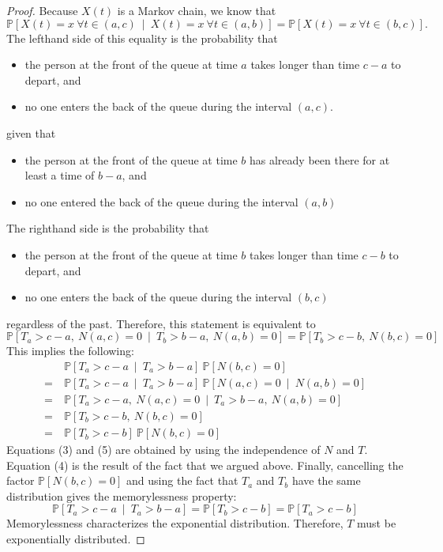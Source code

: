 \documentclass[12pt]{article}
\newcommand{\p}{\mathbb{P}}
\newcommand{\given}{\ \mid \ }
\theoremstyle{definition}
\begin{document}
\begin{proof}
Because $X(t)$ is a Markov chain, we know that
$$\p[X(t) = x \ \forall t \in (a,c) \given X(t) = x \ \forall t \in (a,b)] = \p[X(t) = x \ \forall t \in (b,c)].$$  The lefthand side of this equality is the probability that
\begin{itemize}
\item the person at the front of the queue at time $a$ takes longer than time $c-a$ to depart, and
\item no one enters the back of the queue during the interval $(a,c)$.
\end{itemize}
given that
\begin{itemize}
\item the person at the front of the queue at time $b$ has already been there for at least a time of $b-a$, and
\item no one entered the back of the queue during the interval $(a,b)$
\end{itemize}
The righthand side is the probability that \begin{itemize}
\item the person at the front of the queue at time $b$ takes longer than time $c-b$ to depart, and
\item no one enters the back of the queue during the interval $(b,c)$
\end{itemize}
regardless of the past.  Therefore, this statement is equivalent to
$$
\p[T_a > c-a, \ N(a,c) = 0 \given T_b > b-a, \ N(a,b) = 0] = \p[T_b > c-b, \ N(b,c) = 0]
$$
This implies the following:
\begin{align}
& \ \p[T_a > c-a \given T_a > b-a] \ \p[N(b,c) = 0]
\\
= & \ \p[T_a > c-a \given T_a > b-a] \ \p[N(a,c) = 0 \given  N(a,b) = 0]
\\
= & \ \p[T_a > c-a, \ N(a,c) = 0 \given T_a > b-a, \ N(a,b) = 0]
\\
= & \ \p[T_b > c-b, \ N(b,c) = 0]
\\
= & \ \p[T_b > c-b] \ \p[N(b,c) = 0]
\end{align}
Equations (3) and (5) are obtained by using the independence of $N$ and $T$.  Equation (4) is the result of the fact that we argued above.  Finally, cancelling the factor $\p[N(b,c) = 0]$ and using the fact that $T_a$ and $T_b$ have the same distribution gives the memorylessness property:
$$ \p[T_a > c-a \given T_a > b-a] = \p[T_b > c-b] = \p[T_a > c-b]$$
Memorylessness characterizes the exponential distribution.  Therefore, $T$ must be exponentially distributed.


\end{proof}
\end{document}
